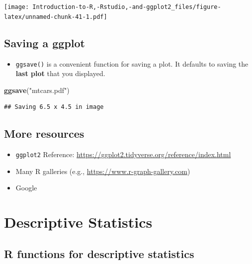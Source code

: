 \documentclass[]{book}
\newenvironment{Shaded}{\begin{snugshade}}{\end{snugshade}}
\newcommand{\KeywordTok}[1]{\textcolor[rgb]{0.13,0.29,0.53}{\textbf{#1}}}
\newcommand{\NormalTok}[1]{#1}
\newcommand{\StringTok}[1]{\textcolor[rgb]{0.31,0.60,0.02}{#1}}
\providecommand{\tightlist}{%
  \setlength{\itemsep}{0pt}\setlength{\parskip}{0pt}}
\begin{document}
\texttt{[image: Introduction-to-R,-Rstudio,-and-ggplot2\_files/figure-latex/unnamed-chunk-41-1.pdf]}

\hypertarget{saving-a-ggplot}{%
\section{Saving a ggplot}\label{saving-a-ggplot}}

\begin{itemize}
\tightlist
\item
  \texttt{ggsave()} is a convenient function for saving a plot. It defaults to saving the \textbf{last plot} that you displayed.
\end{itemize}

\begin{Shaded}
\begin{Highlighting}[]
\KeywordTok{ggsave}\NormalTok{(}\StringTok{"mtcars.pdf"}\NormalTok{)}
\end{Highlighting}
\end{Shaded}

\begin{verbatim}
## Saving 6.5 x 4.5 in image
\end{verbatim}

\hypertarget{more-resources}{%
\section{More resources}\label{more-resources}}

\begin{itemize}
\tightlist
\item
  \texttt{ggplot2} Reference: \url{https://ggplot2.tidyverse.org/reference/index.html}
\item
  Many R galleries (e.g., \url{https://www.r-graph-gallery.com})
\item
  Google
\end{itemize}

\hypertarget{descriptive-statistics}{%
\chapter{Descriptive Statistics}\label{descriptive-statistics}}

\hypertarget{r-functions-for-descriptive-statistics}{%
\section{R functions for descriptive statistics}\label{r-functions-for-descriptive-statistics}}
\end{document}
